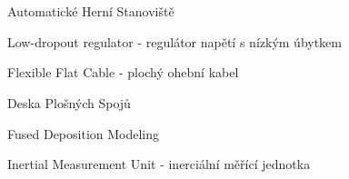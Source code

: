 \cleardoublepage
\chapter*{\listofabbrevname}
{}

\begin{acronym}[KolikMista]

		{Automatické Herní Stanoviště}

		{Low-dropout regulator - regulátor napětí s nízkým úbytkem}

		{Flexible Flat Cable - plochý ohební kabel}					%

		{Deska Plošných Spojů}    %
	

	{Fused Deposition Modeling}%

	{Inertial Measurement Unit - inerciální měřící jednotka}%

\end{acronym}
